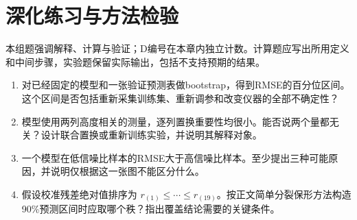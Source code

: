 \section*{深化练习与方法检验}
本组题强调解释、计算与验证；D编号在本章内独立计数。计算题应写出所用定义和中间步骤，实验题保留实际输出，包括不支持预期的结果。
\begin{enumerate}[label=D\arabic*.]
\item 对已经固定的模型和一张验证预测表做bootstrap，得到RMSE的百分位区间。这个区间是否包括重新采集训练集、重新调参和改变仪器的全部不确定性？
\item 模型使用两列高度相关的测量，逐列置换重要性均很小。能否说两个量都无关？设计联合置换或重新训练实验，并说明其解释对象。
\item 一个模型在低信噪比样本的RMSE大于高信噪比样本。至少提出三种可能原因，并说明仅根据这一张图不能区分什么。
\item 假设校准残差绝对值排序为 $r_{(1)}\le\cdots\le r_{(19)}$。按正文简单分裂保形方法构造90\%预测区间时应取哪个秩？指出覆盖结论需要的关键条件。
\end{enumerate}
